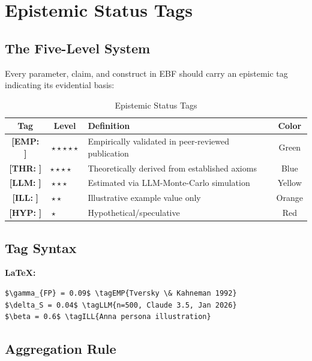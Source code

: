 \documentclass[11pt,a4paper]{article}
\newcommand{\tagEMP}[1]{\textcolor{empgreen}{\textbf{[EMP:} #1\textbf{]}}}
\newcommand{\tagTHR}[1]{\textcolor{thrblue}{\textbf{[THR:} #1\textbf{]}}}
\newcommand{\tagLLM}[1]{\textcolor{llmyellow}{\textbf{[LLM:} #1\textbf{]}}}
\newcommand{\tagILL}[1]{\textcolor{illorange}{\textbf{[ILL:} #1\textbf{]}}}
\newcommand{\tagHYP}[1]{\textcolor{hypred}{\textbf{[HYP:} #1\textbf{]}}}
\begin{document}
\section{Epistemic Status Tags}
\label{sec:tags}

\subsection{The Five-Level System}

Every parameter, claim, and construct in EBF should carry an epistemic tag indicating its evidential basis:

\begin{table}[h]
\centering
\caption{Epistemic Status Tags}
\label{tab:tags}
\begin{tabular}{ccp{7cm}c}
\toprule
\textbf{Tag} & \textbf{Level} & \textbf{Definition} & \textbf{Color} \\
\midrule
\tagEMP{} & $\star\star\star\star\star$ & Empirically validated in peer-reviewed publication & Green \\
\tagTHR{} & $\star\star\star\star\phantom{\star}$ & Theoretically derived from established axioms & Blue \\
\tagLLM{} & $\star\star\star\phantom{\star\star}$ & Estimated via LLM-Monte-Carlo simulation & Yellow \\
\tagILL{} & $\star\star\phantom{\star\star\star}$ & Illustrative example value only & Orange \\
\tagHYP{} & $\star\phantom{\star\star\star\star}$ & Hypothetical/speculative & Red \\
\bottomrule
\end{tabular}
\end{table}

\subsection{Tag Syntax}

\textbf{LaTeX:}
\begin{verbatim}
$\gamma_{FP} = 0.09$ \tagEMP{Tversky \& Kahneman 1992}
$\delta_S = 0.04$ \tagLLM{n=500, Claude 3.5, Jan 2026}
$\beta = 0.6$ \tagILL{Anna persona illustration}
\end{verbatim}

\subsection{Aggregation Rule}
\end{document}

